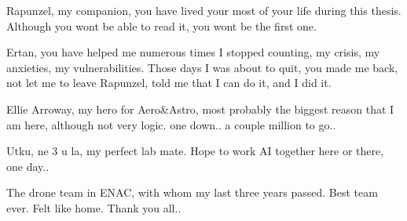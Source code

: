 Rapunzel, my companion, you have lived your most of your life during this thesis. Although you wont be able to read it, you wont be the first one. 

Ertan, you have helped me numerous times I stopped counting, my crisis, my anxieties, my vulnerabilities. Those days I was about to quit, you made me back, not let me to leave Rapunzel, told me that I can do it, and I did it. 

Ellie Arroway, my hero for Aero&Astro, most probably the biggest reason that I am here, although not very logic. one down.. a couple million to go.. 

Utku, ne 3 u la, my perfect lab mate. Hope to work AI together here or there, one day.. 

The drone team in ENAC, with whom my last three years passed. Best team ever. Felt like home. Thank you all..